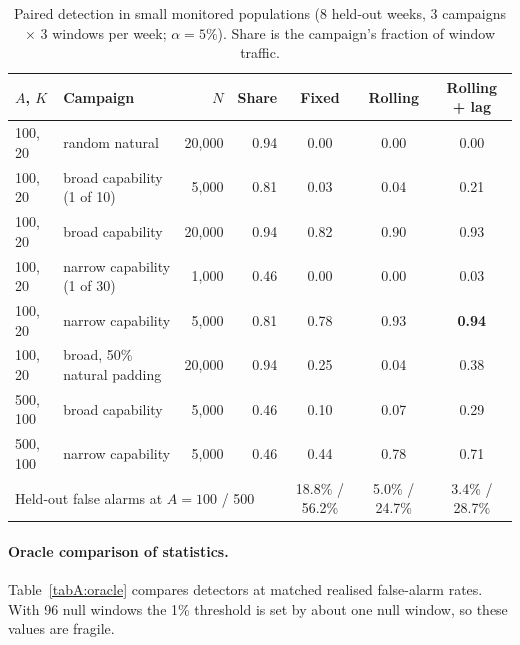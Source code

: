 \begin{table}[h]
\centering
\caption{Paired detection in small monitored populations (8 held-out weeks, 3 campaigns $\times$ 3 windows per week; $\alpha=5\%$). Share is the campaign's fraction of window traffic.}
\label{tabA:smallpop}
\footnotesize\setlength{\tabcolsep}{3pt}
\begin{tabular}{llrrccc}
\toprule
$A$, $K$ & Campaign & $N$ & Share & Fixed & Rolling & Rolling + lag \\
\midrule
100, 20 & random natural & 20{,}000 & 0.94 & 0.00 & 0.00 & 0.00 \\
100, 20 & broad capability (1 of 10) & 5{,}000 & 0.81 & 0.03 & 0.04 & 0.21 \\
100, 20 & broad capability & 20{,}000 & 0.94 & 0.82 & 0.90 & 0.93 \\
100, 20 & narrow capability (1 of 30) & 1{,}000 & 0.46 & 0.00 & 0.00 & 0.03 \\
100, 20 & narrow capability & 5{,}000 & 0.81 & 0.78 & 0.93 & \textbf{0.94} \\
100, 20 & broad, 50\% natural padding & 20{,}000 & 0.94 & 0.25 & 0.04 & 0.38 \\
500, 100 & broad capability & 5{,}000 & 0.46 & 0.10 & 0.07 & 0.29 \\
500, 100 & narrow capability & 5{,}000 & 0.46 & 0.44 & 0.78 & 0.71 \\
\midrule
\multicolumn{4}{l}{Held-out false alarms at $A=100$ / 500} & 18.8\% / 56.2\% & 5.0\% / 24.7\% & 3.4\% / 28.7\% \\
\bottomrule
\end{tabular}
\end{table}

\paragraph{Oracle comparison of statistics.} Table~\ref{tabA:oracle} compares detectors at matched realised false-alarm rates. With 96 null windows the 1\% threshold is set by about one null window, so these values are fragile.

